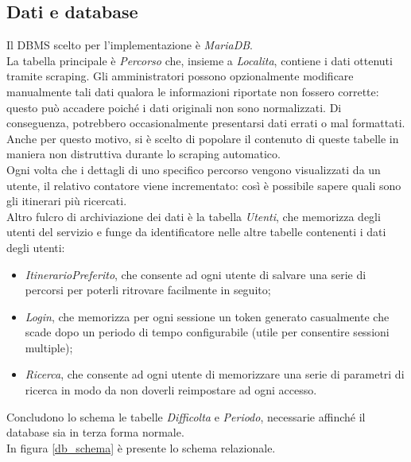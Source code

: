 \documentclass[11pt]{report}
\begin{document}
\subsection{Dati e database}
Il DBMS scelto per l'implementazione è \textit{MariaDB}.
\\La tabella principale è \textit{Percorso} che, insieme a \textit{Localita}, contiene i dati ottenuti tramite scraping.
Gli amministratori possono opzionalmente modificare manualmente tali dati qualora le informazioni riportate non fossero corrette: questo può accadere poiché i dati originali non sono normalizzati.
Di conseguenza, potrebbero occasionalmente presentarsi dati errati o mal formattati.
Anche per questo motivo, si è scelto di popolare il contenuto di queste tabelle in maniera non distruttiva durante lo scraping automatico.
\\Ogni volta che i dettagli di uno specifico percorso vengono visualizzati da un utente, il relativo contatore viene incrementato: così è possibile sapere quali sono gli itinerari più ricercati.
\\Altro fulcro di archiviazione dei dati è la tabella \textit{Utenti}, che memorizza  degli utenti del servizio e funge da identificatore nelle altre tabelle contenenti i dati degli utenti:
\begin{itemize}
	\item \textit{ItinerarioPreferito}, che consente ad ogni utente di salvare una serie di percorsi per poterli ritrovare facilmente in seguito;
	\item \textit{Login}, che memorizza per ogni sessione un token generato casualmente che scade dopo un periodo di tempo configurabile (utile per consentire sessioni multiple);
	\item \textit{Ricerca}, che consente ad ogni utente di memorizzare una serie di parametri di ricerca in modo da non doverli reimpostare ad ogni accesso.
\end{itemize}
Concludono lo schema le tabelle \textit{Difficolta} e \textit{Periodo}, necessarie affinché il database sia in terza forma normale.
\\In figura \ref{db_schema} è presente lo schema relazionale.
\end{document}
